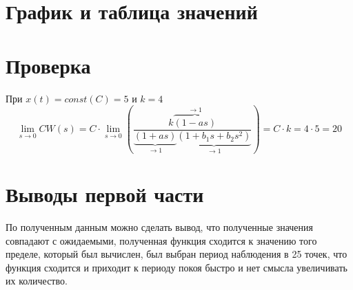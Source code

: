     \section{График и таблица значений}
        \begin{center}
            \vspace{1cm}
        \end{center}

    \section{Проверка}
        При $x(t) = const (C) = 5$ и $k = 4$
        $$
            \lim_{s\to0}CW(s) = C \cdot \lim_{s\to0}\left(\dfrac{k\overbrace{(1-as)}^{\to1}}{\underbrace{(1+as)}_{\to1}\underbrace{(1+b_1s+b_2s^2)}_{\to1}}\right) = C \cdot k = 4 \cdot 5 = 20
        $$

    \section{Выводы первой части}
        По полученным данным можно сделать вывод, что полученные значения совпадают с ожидаемыми, полученная функция сходится к значению того пределе, который был вычислен, был выбран период наблюдения в 25 точек, что функция сходится и приходит к периоду покоя быстро и нет смысла увеличивать их количество.

